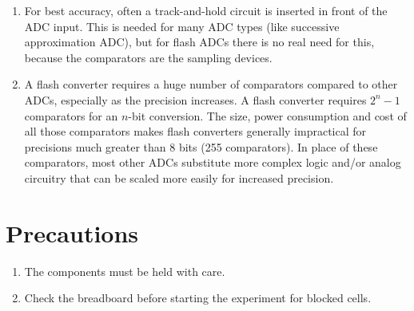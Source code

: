 \documentclass[%
 reprint,
nofootinbib,
 amsmath,amssymb,
 aps,
floatfix,
]{revtex4-2}
\begin{document}
\begin{enumerate}
        \item For best accuracy, often a track-and-hold circuit is inserted in front of the ADC input. This is needed for many ADC types (like successive approximation ADC), but for flash ADCs there is no real need for this, because the comparators are the sampling devices.
        \item A flash converter requires a huge number of comparators compared to other ADCs, especially as the precision increases. A flash converter requires $2^n - 1$ comparators for an $n$-bit conversion. The size, power consumption and cost of all those comparators makes flash converters generally impractical for precisions much greater than 8 bits (255 comparators). In place of these comparators, most other ADCs substitute more complex logic and/or analog circuitry that can be scaled more easily for increased precision.
    \end{enumerate}

\section{Precautions}
    \begin{enumerate}
        \item The components must be held with care.
        \item Check the breadboard before starting the experiment for blocked cells.
    \end{enumerate}
\end{document}
